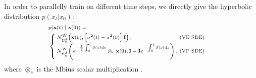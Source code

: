 \documentclass[letterpaper]{article} %
\begin{document}
In order to parallelly train on different time steps, we directly give the hyperbolic distribution $p (x_t | x_0)$: 
\begin{equation}\label{10}
\begin{scriptsize}{
\begin{aligned}
    &p(\mathbf{x}(t) \mid \mathbf{x}(0))=\\ &\left\{\hspace{-0.1cm}\begin{array}{ll}
\mathcal{N}_{\mathcal{B}_{c}^{d}}^{\mathrm{W}}\!\left(\mathbf{x}(0),\left[\sigma^{2}(t)-\sigma^{2}(0)\right] \mathbf{I}\right), &\hspace{-0.25cm} \text{(VE SDE)} \\
\mathcal{N}_{\mathcal{B}_{c}^{d}}^{\mathrm{W}}\!\left(e^{-\frac{1}{2} \int_{0}^{t} \beta(s) \mathrm{d} s}\otimes_c \mathbf{x}(0) , \mathbf{I}-\mathbf{I} e^{-\int_{0}^{t} \beta(s) \mathrm{d} s}\right), &\hspace{-0.25cm} (\text{VP SDE)} \\
\end{array}\right.
\end{aligned}
}\end{scriptsize}
\end{equation}
%
where $\otimes_c$ is the Mbius scalar multiplication \cite{ungar2007hyperbolic}. 
\end{document}
